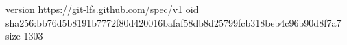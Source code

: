 version https://git-lfs.github.com/spec/v1
oid sha256:bb76d5b8191b7772f80d420016bafaf58db8d25799fcb318beb4c96b90d8f7a7
size 1303
